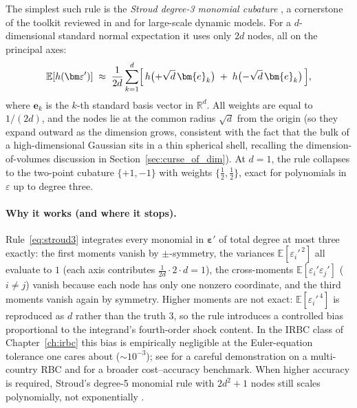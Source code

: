 \documentclass[11pt,a4paper]{report}
\newcommand{\R}{\mathbb{R}}
\newcommand{\E}[1]{\mathbb{E}\!\left[#1\right]}
\begin{document}
The simplest such rule is the \emph{Stroud degree-3 monomial cubature} \citep[formula E$_n^{r^2}$ 3-1]{stroud1971approximate}, a cornerstone of the toolkit reviewed in \citet[\S 7.5]{judd1998numerical} and \citet[\S 5.3]{Maliar2014325} for large-scale dynamic models.  For a $d$-dimensional standard normal expectation it uses only $2d$ nodes, all on the principal axes:
\begin{equation}
\E{h(\bm\varepsilon')} \;\approx\; \frac{1}{2d} \sum_{k=1}^{d}\Bigl[\, h\bigl(+\sqrt{d}\,\bm{e}_k\bigr) \;+\; h\bigl(-\sqrt{d}\,\bm{e}_k\bigr)\,\Bigr],
\label{eq:stroud3}
\end{equation}
where $\bm{e}_k$ is the $k$-th standard basis vector in $\R^{d}$.  All weights are equal to $1/(2d)$, and the nodes lie at the common radius $\sqrt{d}$ from the origin (so they expand outward as the dimension grows, consistent with the fact that the bulk of a high-dimensional Gaussian sits in a thin spherical shell, recalling the dimension-of-volumes discussion in Section~\ref{sec:curse_of_dim}).  At $d=1$, the rule collapses to the two-point cubature $\{+1, -1\}$ with weights $\{\tfrac12, \tfrac12\}$, exact for polynomials in $\varepsilon$ up to degree three.

\paragraph{Why it works (and where it stops).}  Rule~\eqref{eq:stroud3} integrates every monomial in $\bm\varepsilon'$ of total degree at most three exactly: the first moments vanish by $\pm$-symmetry, the variances $\E{\varepsilon_i'^{\,2}}$ all evaluate to $1$ (each axis contributes $\tfrac{1}{2d} \cdot 2 \cdot d = 1$), the cross-moments $\E{\varepsilon_i' \varepsilon_j'}$ ($i \neq j$) vanish because each node has only one nonzero coordinate, and the third moments vanish again by symmetry.  Higher moments are not exact: $\E{\varepsilon_i'^{\,4}}$ is reproduced as $d$ rather than the truth $3$, so the rule introduces a controlled bias proportional to the integrand's fourth-order shock content.  In the IRBC class of Chapter~\ref{ch:irbc} this bias is empirically negligible at the Euler-equation tolerance one cares about ($\sim 10^{-3}$); see \citet{pichler2011} for a careful demonstration on a multi-country RBC and \citet[Table~5]{Maliar2014325} for a broader cost--accuracy benchmark.  When higher accuracy is required, Stroud's degree-5 monomial rule with $2d^2 + 1$ nodes still scales polynomially, not exponentially \citep[\S 7.5]{judd1998numerical}.
\end{document}
